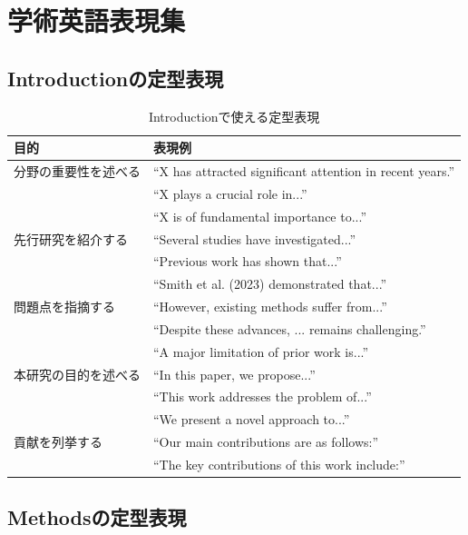 \section{学術英語表現集}
\label{sec:4.7}

\subsection{Introductionの定型表現}

\begin{table}[htbp]
\centering
\caption{Introductionで使える定型表現}
\label{tab:intro-expressions}
\footnotesize
\begin{tabular}{lp{}}
\toprule
目的 & 表現例 \\
\midrule
分野の重要性を述べる & ``X has attracted significant attention in recent years.'' \\
 & ``X plays a crucial role in...'' \\
 & ``X is of fundamental importance to...'' \\
\midrule
先行研究を紹介する & ``Several studies have investigated...'' \\
 & ``Previous work has shown that...'' \\
 & ``Smith et al. (2023) demonstrated that...'' \\
\midrule
問題点を指摘する & ``However, existing methods suffer from...'' \\
 & ``Despite these advances, ... remains challenging.'' \\
 & ``A major limitation of prior work is...'' \\
\midrule
本研究の目的を述べる & ``In this paper, we propose...'' \\
 & ``This work addresses the problem of...'' \\
 & ``We present a novel approach to...'' \\
\midrule
貢献を列挙する & ``Our main contributions are as follows:'' \\
 & ``The key contributions of this work include:'' \\
\bottomrule
\end{tabular}
\end{table}

\subsection{Methodsの定型表現}

